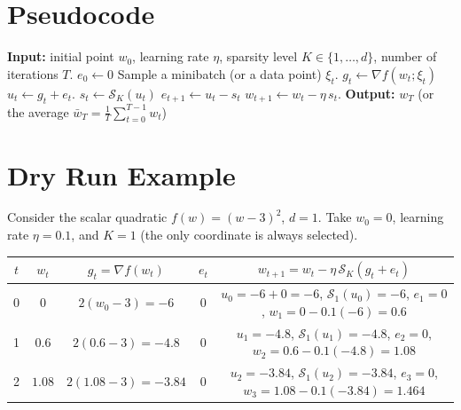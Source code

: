 \documentclass[11pt]{article}
\begin{document}
\section*{Pseudocode}
\begin{algorithm}[h]
\caption{Top‑K EF‑SGD}
\begin{algorithmic}[1]
\State \textbf{Input:} initial point $w_{0}$, learning rate $\eta$, sparsity level $K\in\{1,\dots,d\}$, number of iterations $T$.
\State $e_{0}\gets 0$ 
    \State Sample a minibatch (or a data point) $\xi_{t}$.
    \State $g_{t}\gets \nabla f(w_{t};\xi_{t})$ 
    \State $u_{t}\gets g_{t}+e_{t}$.
    \State $s_{t}\gets \mathcal{S}_{K}(u_{t})$ 
    \State $e_{t+1}\gets u_{t}-s_{t}$ 
    \State $w_{t+1}\gets w_{t}-\eta\, s_{t}$.
\EndFor
\State \textbf{Output:} $w_{T}$ (or the average $\bar w_{T}=\frac1T\sum_{t=0}^{T-1}w_{t}$)
\end{algorithmic}
\end{algorithm}

\section*{Dry Run Example}
Consider the scalar quadratic $f(w)=(w-3)^{2}$, $d=1$.  
Take $w_{0}=0$, learning rate $\eta=0.1$, and $K=1$ (the only coordinate is always selected).

\begin{center}
\begin{tabular}{c|c|c|c|c}
\toprule
$t$ & $w_{t}$ & $g_{t}= \nabla f(w_{t})$ & $e_{t}$ & $w_{t+1}=w_{t}-\eta\,\mathcal{S}_{K}(g_{t}+e_{t})$ \\
\midrule
0 & $0$ & $2(w_{0}-3)=-6$ & $0$ &
\begin{minipage}{4.5cm}
$u_{0}= -6+0 = -6$, $\mathcal{S}_{1}(u_{0})=-6$, $e_{1}=0$, $w_{1}=0-0.1(-6)=0.6$
\end{minipage}\\
\midrule
1 & $0.6$ & $2(0.6-3)=-4.8$ & $0$ &
\begin{minipage}{4.5cm}
$u_{1}=-4.8$, $\mathcal{S}_{1}(u_{1})=-4.8$, $e_{2}=0$, $w_{2}=0.6-0.1(-4.8)=1.08$
\end{minipage}\\
\midrule
2 & $1.08$ & $2(1.08-3)=-3.84$ & $0$ &
\begin{minipage}{4.5cm}
$u_{2}=-3.84$, $\mathcal{S}_{1}(u_{2})=-3.84$, $e_{3}=0$, $w_{3}=1.08-0.1(-3.84)=1.464$
\end{minipage}\\
\bottomrule
\end{tabular}
\end{center}
\end{document}
